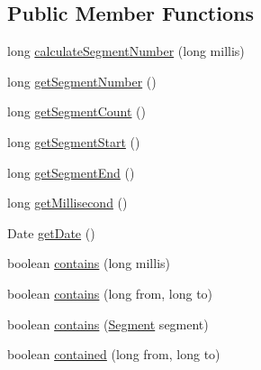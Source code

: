 \subsection*{Public Member Functions}
\begin{DoxyCompactItemize}
\item 
long \mbox{\hyperlink{classorg_1_1jfree_1_1chart_1_1axis_1_1_segmented_timeline_1_1_segment_ae897836573ea7ad678660b4a21ddf9f5}{calculate\+Segment\+Number}} (long millis)
\item 
long \mbox{\hyperlink{classorg_1_1jfree_1_1chart_1_1axis_1_1_segmented_timeline_1_1_segment_ab806f15c345dc084a0b9e67d1e9c10a0}{get\+Segment\+Number}} ()
\item 
long \mbox{\hyperlink{classorg_1_1jfree_1_1chart_1_1axis_1_1_segmented_timeline_1_1_segment_a18cd40e5e5e9b00a720a151368536927}{get\+Segment\+Count}} ()
\item 
long \mbox{\hyperlink{classorg_1_1jfree_1_1chart_1_1axis_1_1_segmented_timeline_1_1_segment_a39c422fba4b04f4da3093b4ca4874bf6}{get\+Segment\+Start}} ()
\item 
long \mbox{\hyperlink{classorg_1_1jfree_1_1chart_1_1axis_1_1_segmented_timeline_1_1_segment_ae3180fa4746973d6ddb528635dbe9714}{get\+Segment\+End}} ()
\item 
long \mbox{\hyperlink{classorg_1_1jfree_1_1chart_1_1axis_1_1_segmented_timeline_1_1_segment_a895e12610bc553e84557c1c0f5f1eda0}{get\+Millisecond}} ()
\item 
Date \mbox{\hyperlink{classorg_1_1jfree_1_1chart_1_1axis_1_1_segmented_timeline_1_1_segment_a498f7721a0a32dc5c6dc514fb91a1809}{get\+Date}} ()
\item 
boolean \mbox{\hyperlink{classorg_1_1jfree_1_1chart_1_1axis_1_1_segmented_timeline_1_1_segment_a0e0b4847871d4cb22fa64e79e933ad2e}{contains}} (long millis)
\item 
boolean \mbox{\hyperlink{classorg_1_1jfree_1_1chart_1_1axis_1_1_segmented_timeline_1_1_segment_a51d3d71b20d5224788e21a54d600bbd1}{contains}} (long from, long to)
\item 
boolean \mbox{\hyperlink{classorg_1_1jfree_1_1chart_1_1axis_1_1_segmented_timeline_1_1_segment_aa136f581b0af583787d085be40554849}{contains}} (\mbox{\hyperlink{classorg_1_1jfree_1_1chart_1_1axis_1_1_segmented_timeline_1_1_segment}{Segment}} segment)
\item 
boolean \mbox{\hyperlink{classorg_1_1jfree_1_1chart_1_1axis_1_1_segmented_timeline_1_1_segment_a53f2e56cf31107813c65f85ed5648c65}{contained}} (long from, long to)
\item 

\end{DoxyCompactItemize}
